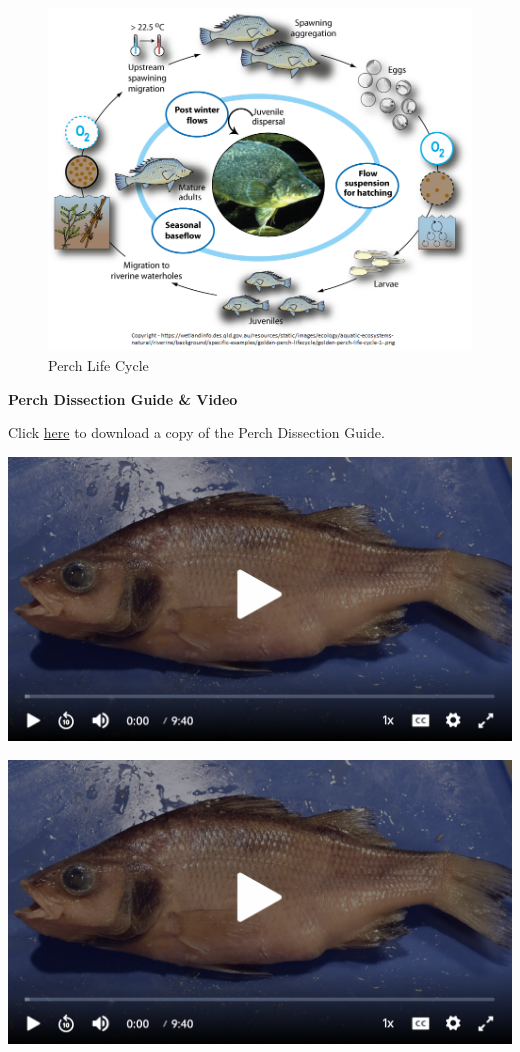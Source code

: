 \documentclass[
]{book}
\begin{document}
\begin{figure}
\centering
\includegraphics{images/Lab6_perch_life_cycle.png}
\caption{Perch Life Cycle}
\end{figure}

\textbf{Perch Dissection Guide \& Video}

Click \href{files/Lab6_perch_dissection_guide.pdf}{here} to download a copy of the Perch Dissection Guide.

\includegraphics{images/Lab6_Perch_Dissection_Video1.png}

\includegraphics{images/Lab6_Perch_Dissection_Video1.png}
\end{document}
